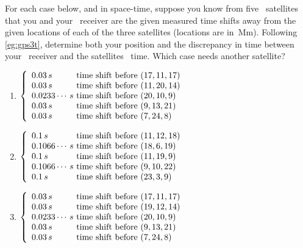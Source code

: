 \begin{comment}
Possibly polynomial\slash multivariate curve fitting (exact)  \larsvii{p.25--8} as example of data mining, and scientific and engineering inference? e.g.~discovering `index' combinations.
Applications involving homogeneous systems, such as balance chemical reactions, leave for the next section.
Nakos~\S1.4 has lots of good ideas (including derivation of cosine rule for triangles).
\end{comment}





\begin{exercise} \label{ex:gps3t} 
For each case below, and in space-time, suppose you know from five \gps\ satellites that you and your \gps\ receiver are the given measured time shifts away from the given locations of each of the three satellites (locations are in~Mm).  
Following \cref{eg:gps3t}, determine both your position and the discrepancy in time between your \gps\ receiver and the satellites \gps\ time.  
Which case needs another satellite?
\begin{enumerate}
\item  
\(\left\{\begin{array}{l@{\text{ time shift before }}l}
0.03\,s&(17,11,17)\\
0.03\,s&(11,20,14)\\
0.0233\cdots\,s&(20,10,9)\\
0.03\,s&(9,13,21)\\
0.03\,s&(7,24,8)
\end{array}\right.\)

\item 
\(\left\{\begin{array}{l@{\text{ time shift before }}l}
0.1\,s&(11,12,18)\\
0.1066\cdots\,s&(18,6,19)\\
0.1\,s&(11,19,9)\\
0.1066\cdots\,s&(9,10,22)\\
0.1\,s&(23,3,9)
\end{array}\right.\)

\item 
\(\left\{\begin{array}{l@{\text{ time shift before }}l}
0.03\,s&(17,11,17)\\
0.03\,s&(19,12,14)\\
0.0233\cdots\,s&(20,10,9)\\
0.03\,s&(9,13,21)\\
0.03\,s&(7,24,8)
\end{array}\right.\)

\end{enumerate}
\end{exercise}






